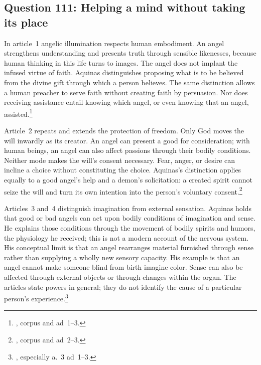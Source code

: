 
\subsection{Question 111: Helping a mind without taking its place}\label{q111}
In article~1 angelic illumination respects human embodiment. An angel strengthens understanding and presents truth through sensible likenesses, because human thinking in this life turns to images. The angel does not implant the infused virtue of faith. Aquinas distinguishes proposing what is to be believed from the divine gift through which a person believes. The same distinction allows a human preacher to serve faith without creating faith by persuasion. Nor does receiving assistance entail knowing which angel, or even knowing that an angel, assisted.\footnote{, corpus and ad~1--3.}

Article~2 repeats and extends the protection of freedom. Only God moves the will inwardly as its creator. An angel can present a good for consideration; with human beings, an angel can also affect passions through their bodily conditions. Neither mode makes the will's consent necessary. Fear, anger, or desire can incline a choice without constituting the choice. Aquinas's distinction applies equally to a good angel's help and a demon's solicitation: a created spirit cannot seize the will and turn its own intention into the person's voluntary consent.\footnote{, corpus and ad~2--3.}

Articles~3 and~4 distinguish imagination from external sensation. Aquinas holds that good or bad angels can act upon bodily conditions of imagination and sense. He explains those conditions through the movement of bodily spirits and humors, the physiology he received; this is not a modern account of the nervous system. His conceptual limit is that an angel rearranges material furnished through sense rather than supplying a wholly new sensory capacity. His example is that an angel cannot make someone blind from birth imagine color. Sense can also be affected through external objects or through changes within the organ. The articles state powers in general; they do not identify the cause of a particular person's experience.\footnote{, especially a.~3 ad~1--3.}


